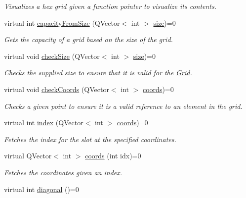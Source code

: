 \begin{DoxyCompactItemize}
\begin{DoxyCompactList}\small\item\em \-Visualizes a hex grid given a function pointer to visualize its contents. \end{DoxyCompactList}\item 
\hypertarget{classhsom_1_1_grid_a785a4cfed83dd7a58fa8bc0b52e852d4}{virtual int \hyperlink{classhsom_1_1_grid_a785a4cfed83dd7a58fa8bc0b52e852d4}{capacity\-From\-Size} (\-Q\-Vector$<$ int $>$ \hyperlink{classhsom_1_1_grid_a3e846473299eb2c7c259659eb61a6234}{size})=0}\label{classhsom_1_1_grid_a785a4cfed83dd7a58fa8bc0b52e852d4}

\begin{DoxyCompactList}\small\item\em \-Gets the capacity of a grid based on the size of the grid. \end{DoxyCompactList}\item 
\hypertarget{classhsom_1_1_grid_a00939983a56d5a2aa8a66b8e1fa8a56d}{virtual void \hyperlink{classhsom_1_1_grid_a00939983a56d5a2aa8a66b8e1fa8a56d}{check\-Size} (\-Q\-Vector$<$ int $>$ \hyperlink{classhsom_1_1_grid_a3e846473299eb2c7c259659eb61a6234}{size})=0}\label{classhsom_1_1_grid_a00939983a56d5a2aa8a66b8e1fa8a56d}

\begin{DoxyCompactList}\small\item\em \-Checks the supplied size to ensure that it is valid for the \hyperlink{classhsom_1_1_grid}{\-Grid}. \end{DoxyCompactList}\item 
virtual void \hyperlink{classhsom_1_1_grid_abf12e08a06d3ad123ac7fcb72c04aae6}{check\-Coords} (\-Q\-Vector$<$ int $>$ \hyperlink{classhsom_1_1_grid_a4a68c15ff3ffcd052bff769e4d9e899b}{coords})=0
\begin{DoxyCompactList}\small\item\em \-Checks a given point to ensure it is a valid reference to an element in the grid. \end{DoxyCompactList}\item 
virtual int \hyperlink{classhsom_1_1_grid_a1c3162ea843ab3f7e79136425e011a5d}{index} (\-Q\-Vector$<$ int $>$ \hyperlink{classhsom_1_1_grid_a4a68c15ff3ffcd052bff769e4d9e899b}{coords})=0
\begin{DoxyCompactList}\small\item\em \-Fetches the index for the slot at the specified coordinates. \end{DoxyCompactList}\item 
virtual \-Q\-Vector$<$ int $>$ \hyperlink{classhsom_1_1_grid_a4a68c15ff3ffcd052bff769e4d9e899b}{coords} (int idx)=0
\begin{DoxyCompactList}\small\item\em \-Fetches the coordinates given an index. \end{DoxyCompactList}\item 
\hypertarget{classhsom_1_1_grid_acc0364a698525d1239a7042eb01f79e6}{virtual int \hyperlink{classhsom_1_1_grid_acc0364a698525d1239a7042eb01f79e6}{diagonal} ()=0}\label{classhsom_1_1_grid_acc0364a698525d1239a7042eb01f79e6}


\end{DoxyCompactItemize}
